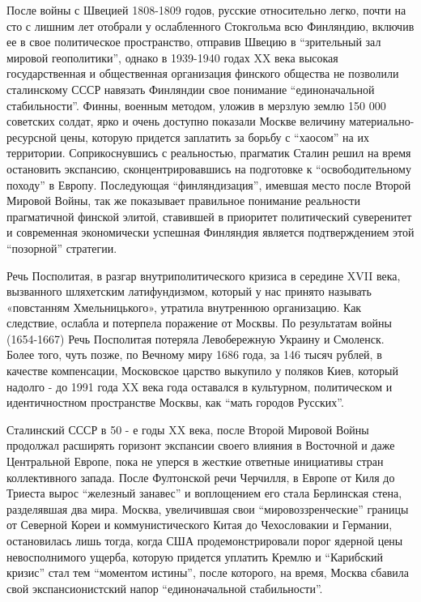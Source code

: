 После войны с Швецией 1808-1809 годов, русские относительно легко, почти на сто
с лишним лет отобрали у ослабленного Стокгольма всю Финляндию, включив ее в
свое политическое пространство, отправив Швецию в \enquote{зрительный зал мировой
геополитики}, однако в 1939-1940 годах XX века высокая государственная и
общественная организация финского общества не позволили сталинскому СССР
навязать Финляндии свое понимание \enquote{единоначальной стабильности}. Финны, военным
методом, уложив в мерзлую землю 150 000 советских солдат, ярко и очень доступно
показали Москве величину материально-ресурсной цены, которую придется заплатить
за борьбу с \enquote{хаосом} на их территории. Соприкоснувшись с реальностью, прагматик
Сталин решил на время остановить экспансию, сконцентрировавшись на подготовке к
\enquote{освободительному походу} в Европу. Последующая \enquote{финляндизация}, имевшая место
после Второй Мировой Войны, так же показывает правильное понимание реальности
прагматичной финской элитой, ставившей в приоритет политический суверенитет и
современная экономически успешная Финляндия является подтверждением этой
\enquote{позорной} стратегии.

Речь Посполитая, в разгар внутриполитического кризиса в середине XVII века,
вызванного шляхетским латифундизмом, который у нас принято называть «повстанням
Хмельницького», утратила внутреннюю организацию. Как следствие, ослабла и
потерпела поражение от Москвы. По результатам войны (1654-1667) Речь Посполитая
потеряла Левобережную Украину и Смоленск. Более того, чуть позже, по Вечному
миру 1686 года, за 146 тысяч рублей, в качестве компенсации, Московское царство
выкупило у поляков Киев, который надолго - до 1991 года XX века года оставался
в культурном, политическом и идентичностном пространстве Москвы, как \enquote{мать
городов Русских}.

Сталинский СССР в 50 - е годы XX века, после Второй Мировой Войны продолжал
расширять горизонт экспансии своего влияния в Восточной и даже Центральной
Европе, пока не уперся в жесткие ответные инициативы стран коллективного
запада. После Фултонской речи Черчилля, в Европе от Киля до Триеста вырос
\enquote{железный занавес} и воплощением его стала Берлинская стена,
разделявшая два мира. Москва, увеличившая свои \enquote{мировоззренческие}
границы от Северной Кореи и коммунистического Китая до Чехословакии и Германии,
остановилась лишь тогда, когда США продемонстрировали порог ядерной цены
невосполнимого ущерба, которую придется уплатить Кремлю и \enquote{Карибский
кризис} стал тем \enquote{моментом истины}, после которого, на время, Москва
сбавила свой экспансионистский напор \enquote{единоначальной стабильности}.


